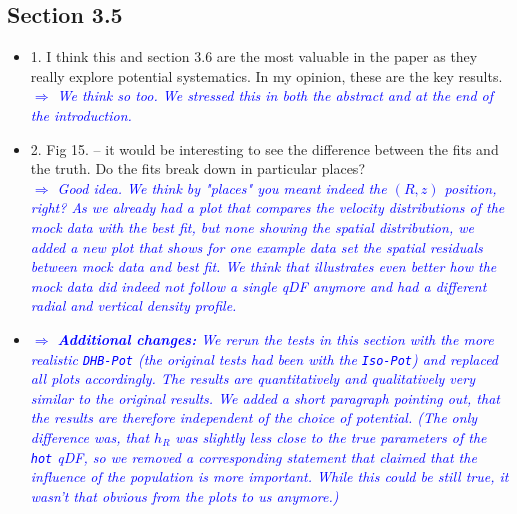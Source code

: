 \documentclass[10pt,a4paper]{article}
\newcommand{\Comment}[1]{\textsl{\textcolor{Blue}{$\Longrightarrow$ {#1}}}}
\begin{document}
\subsection{Section 3.5}
\begin{itemize}
\item 1. I think this and section 3.6 are the most valuable in the paper as they really explore potential systematics. In my opinion, these are the key results. \\\Comment{We think so too. We stressed this in both the abstract and at the end of the introduction.}
\item 2. Fig 15. -- it would be interesting to see the difference between the fits and the truth. Do the fits break down in particular places? \\\Comment{Good idea. We think by "places" you meant indeed the $(R,z)$ position, right? As we already had a plot that compares the velocity distributions of the mock data with the best fit, but none showing the spatial distribution, we added a new plot that shows for one example data set the spatial residuals between mock data and best fit. We think that illustrates even better how the mock data did indeed not follow a single qDF anymore and had a different radial and vertical density profile.}
\item \Comment{\textbf{Additional changes:} We rerun the tests in this section with the more realistic \texttt{DHB-Pot} (the original tests had been with the \texttt{Iso-Pot}) and replaced all plots accordingly. The results are quantitatively and qualitatively very similar to the original results. We added a short paragraph pointing out, that the results are therefore independent of the choice of potential. (The only difference was, that $h_R$ was slightly less close to the true parameters of the \texttt{hot} qDF, so we removed a corresponding statement that claimed that the influence of the \text{hot} population is more important. While this could be still true, it wasn't that obvious from the plots to us anymore.)}
\end{itemize}
\end{document}
